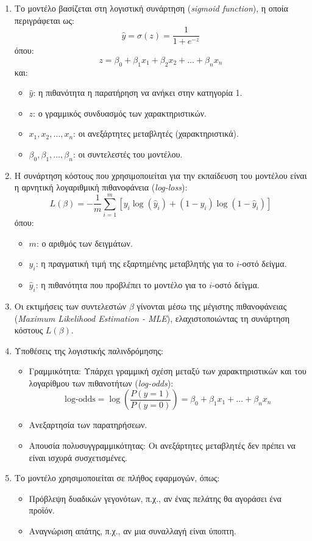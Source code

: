 \documentclass[diploma]{softlab-thesis}
\begin{document}
\begin{enumerate}

\item Το μοντέλο βασίζεται στη λογιστική συνάρτηση (\textit{sigmoid function}), η οποία περιγράφεται ως:
\[
\hat{y} = \sigma(z) = \frac{1}{1 + e^{-z}}
\]
όπου:
\[
z = \beta_0 + \beta_1 x_1 + \beta_2 x_2 + \dots + \beta_n x_n
\]
και:
\begin{itemize}
    \item \( \hat{y} \): η πιθανότητα η παρατήρηση να ανήκει στην κατηγορία 1.
    \item \( z \): ο γραμμικός συνδυασμός των χαρακτηριστικών.
    \item \( x_1, x_2, \dots, x_n \): οι ανεξάρτητες μεταβλητές (χαρακτηριστικά).
    \item \( \beta_0, \beta_1, \dots, \beta_n \): οι συντελεστές του μοντέλου.
\end{itemize}

\item Η συνάρτηση κόστους που χρησιμοποιείται για την εκπαίδευση του μοντέλου είναι η αρνητική λογαριθμική πιθανοφάνεια (\textit{log-loss}):
\[
L(\beta) = - \frac{1}{m} \sum_{i=1}^{m} \left[ y_i \log(\hat{y}_i) + (1 - y_i) \log(1 - \hat{y}_i) \right]
\]
όπου:
\begin{itemize}
    \item \( m \): ο αριθμός των δειγμάτων.
    \item \( y_i \): η πραγματική τιμή της εξαρτημένης μεταβλητής για το \( i \)-οστό δείγμα.
    \item \( \hat{y}_i \): η πιθανότητα που προβλέπει το μοντέλο για το \( i \)-οστό δείγμα.
\end{itemize}

\item Οι εκτιμήσεις των συντελεστών \( \beta \) γίνονται μέσω της μέγιστης πιθανοφάνειας (\textit{Maximum Likelihood Estimation - MLE}), ελαχιστοποιώντας τη συνάρτηση κόστους \( L(\beta) \).

\item Υποθέσεις της λογιστικής παλινδρόμησης:
\begin{itemize}
    \item Γραμμικότητα: Υπάρχει γραμμική σχέση μεταξύ των χαρακτηριστικών και του λογαρίθμου των πιθανοτήτων (\textit{log-odds}):
    \[
    \text{log-odds} = \log\left(\frac{P(y=1)}{P(y=0)}\right) = \beta_0 + \beta_1 x_1 + \dots + \beta_n x_n
    \]
    \item Ανεξαρτησία των παρατηρήσεων.
    \item Απουσία πολυσυγγραμμικότητας: Οι ανεξάρτητες μεταβλητές δεν πρέπει να είναι ισχυρά συσχετισμένες.
\end{itemize}

\item Το μοντέλο χρησιμοποιείται σε πλήθος εφαρμογών, όπως:
\begin{itemize}
    \item Πρόβλεψη δυαδικών γεγονότων, π.χ., αν ένας πελάτης θα αγοράσει ένα προϊόν.
    \item Αναγνώριση απάτης, π.χ., αν μια συναλλαγή είναι ύποπτη.
\end{itemize}

\end{enumerate}
\end{document}
